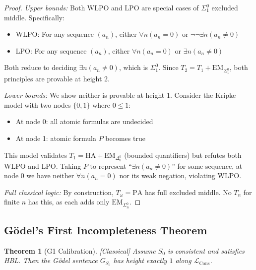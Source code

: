 \documentclass[11pt]{article}
\newtheorem{theorem}{Theorem}[section]
\newcommand{\PA}{\mathrm{PA}}
\newcommand{\HA}{\mathrm{HA}}
\newcommand{\LCons}{\mathcal{L}_{\mathrm{Cons}}}
\newcommand{\EM}{\mathrm{EM}}
\newcommand{\LPO}{\mathrm{LPO}}
\newcommand{\WLPO}{\mathrm{WLPO}}
\newcommand{\leancited}{\textsf{\textcolor{blue!70!black}{[Classical]}}}
\begin{document}
\begin{proof}
\emph{Upper bounds:} Both $\WLPO$ and $\LPO$ are special cases of $\Sigma^0_1$ excluded middle. Specifically:
\begin{itemize}
\item $\WLPO$: For any sequence $(a_n)$, either $\forall n(a_n = 0)$ or $\neg\neg\exists n(a_n \neq 0)$
\item $\LPO$: For any sequence $(a_n)$, either $\forall n(a_n = 0)$ or $\exists n(a_n \neq 0)$
\end{itemize}

Both reduce to deciding $\exists n(a_n \neq 0)$, which is $\Sigma^0_1$. Since $T_2 = T_1 + \EM_{\Sigma^0_1}$, both principles are provable at height 2.

\emph{Lower bounds:} We show neither is provable at height 1. Consider the Kripke model with two nodes $\{0,1\}$ where $0 \leq 1$:
\begin{itemize}
\item At node 0: all atomic formulas are undecided
\item At node 1: atomic formula $P$ becomes true
\end{itemize}

This model validates $T_1 = \HA + \EM_{\Delta^0_0}$ (bounded quantifiers) but refutes both $\WLPO$ and $\LPO$. Taking $P$ to represent ``$\exists n(a_n \neq 0)$'' for some sequence, at node 0 we have neither $\forall n(a_n = 0)$ nor its weak negation, violating $\WLPO$.

\emph{Full classical logic:} By construction, $T_\omega = \PA$ has full excluded middle. No $T_n$ for finite $n$ has this, as each adds only $\EM_{\Sigma^0_n}$.
\end{proof}

\subsection{Gödel's First Incompleteness Theorem}

\begin{theorem}[G1 Calibration] \leancited
Assume $S_0$ is consistent and satisfies HBL. Then the Gödel sentence $G_{S_0}$ has height exactly $1$ along $\LCons$.
\end{theorem}
\end{document}

